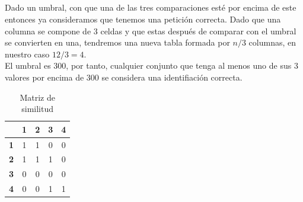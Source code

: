\documentclass[10pt,a4paper]{article}
\begin{document}
\subsection{}
Dado un umbral, con que una de las tres comparaciones esté por encima de este entonces ya consideramos que tenemos una petición correcta. Dado que una columna se compone de 3 celdas y que estas después de comparar con el umbral se convierten en una, tendremos una nueva tabla formada por $n/3$ columnas, en nuestro caso $12/3 = 4$. \\
El umbral es 300, por tanto, cualquier conjunto que tenga al menos uno de sus 3 valores por encima de 300 se considera una identifiación correcta.
\begin{table}[h!]
\begin{center}

\begin{tabular}{|l|c|c|c|c|}
\hline
 & \textbf{1} & \textbf{2} & \textbf{3} & \textbf{4} \\ \hline
 
  \textbf{1} & 1 & 1 & 0 & 0 \\ \hline  
  \textbf{2} & 1 & 1 & 1 & 0 \\ \hline
  \textbf{3} & 0 & 0 & 0 & 0\\ \hline
  \textbf{4} & 0 & 0 & 1 & 1\\ \hline

\end{tabular}

  \caption{Matriz de similitud}
  \label{tabla:similitudes}
\end{center}
\end{table}

\pagebreak
\subsection{}
\begin{table}[h!]
  \caption{Comparaciones correctas o falsas}
  \label{tabla:comparaciones}
\end{table}
\end{document}
